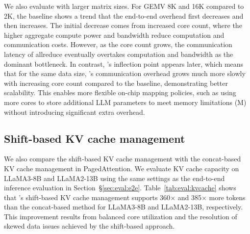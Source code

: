  We also evaluate \gemv with larger matrix sizes. For GEMV 8K and 16K compared to 2K, the baseline shows a trend that the end-to-end overhead first decreases and then increases. The initial decrease comes from increased core count, where the higher aggregate compute power and bandwidth reduce computation and communication costs. However, as the core count grows, the communication latency of allreduce eventually overtakes computation and bandwidth as the dominant bottleneck. In contrast, \gemv's inflection point appears later, which means that for the same data size, \gemv's communication overhead grows much more slowly with increasing core count compared to the baseline, demonstrating better scalability. This enables more flexible on-chip mapping policies, such as using more cores to store additional LLM parameters to meet memory limitations (M) without introducing significant extra overhead.

\vspace{-0.3cm}
\subsection{Shift-based KV cache management}\label{sec:eval:kvcache}
\vspace{-0.2cm}

\begin{table}[t]
  \centering
  \caption{Maximum decode output length}
  \label{tab:eval:kvcache}%
\end{table}%


We also compare the shift-based KV cache management with the concat-based KV cache management in PagedAttention. We evaluate KV cache capacity on LLaMA3-8B and LLaMA2-13B using the same settings as the end-to-end inference evaluation in Section~\S\ref{sec:eval:e2e}. Table~\ref{tab:eval:kvcache} shows that \sys's shift-based KV cache management supports 360$\times$ and 385$\times$ more tokens than the concat-based method for LLaMA3-8B and LLaMA2-13B, respectively. This improvement results from balanced core utilization and the resolution of skewed data issues achieved by the shift-based approach.

